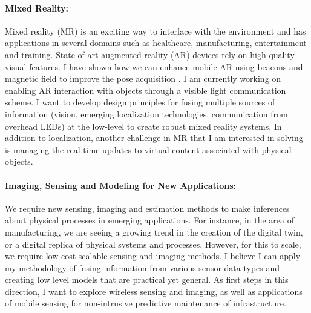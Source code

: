 \documentclass[11pt]{article}
\begin{document}
\paragraph{Mixed Reality: }
Mixed reality (MR) is an exciting way to interface with the environment and has applications in several domains such as healthcare, manufacturing, entertainment and training. %
State-of-art augmented reality (AR) devices rely on high quality visual features. %
I have shown how we can enhance mobile AR using beacons and magnetic field to improve the pose acquisition \cite{mobileAR}. I am currently working on enabling AR interaction with objects through a visible light communication scheme. I want to develop design principles for fusing multiple sources of information (vision, emerging localization technologies, communication from overhead LEDs) at the low-level to create robust mixed reality systems. %
In addition to localization, another challenge in MR that I am interested in solving is managing the real-time updates to virtual content associated with physical objects. 

\paragraph{Imaging, Sensing and Modeling for New Applications: }
We require new sensing, imaging and estimation methods to make inferences about physical processes in emerging applications. For instance, in the area of manufacturing, we are seeing a growing trend in the creation of the digital twin, or a digital replica of physical systems and processes. However, for this to scale, we require low-cost scalable sensing and imaging methods. I believe I can apply my methodology of fusing information from various sensor data types and creating low level models that are practical yet general. As first steps in this direction, I want to explore wireless sensing and imaging, as well as applications of mobile sensing for non-intrusive predictive maintenance of infrastructure.
\end{document}
